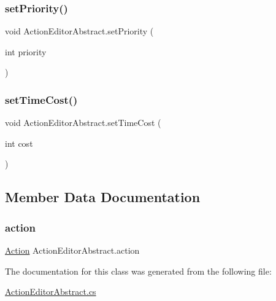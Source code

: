 \mbox{\label{class_action_editor_abstract_a2b18204979082f6227f55e357cdcc5d5}} 
\subsubsection{\texorpdfstring{set\+Priority()}{setPriority()}}
{\footnotesize\ttfamily void Action\+Editor\+Abstract.\+set\+Priority (\begin{DoxyParamCaption}\item[{int}]{priority }\end{DoxyParamCaption})}

\mbox{\label{class_action_editor_abstract_aa6da20f7ed4358957d5c4a0d3b191877}} 
\subsubsection{\texorpdfstring{set\+Time\+Cost()}{setTimeCost()}}
{\footnotesize\ttfamily void Action\+Editor\+Abstract.\+set\+Time\+Cost (\begin{DoxyParamCaption}\item[{int}]{cost }\end{DoxyParamCaption})}



\subsection{Member Data Documentation}
\mbox{\label{class_action_editor_abstract_a58e0f5d65d95e8e4b80a0b3d5e82ce7b}} 
\subsubsection{\texorpdfstring{action}{action}}
{\footnotesize\ttfamily \mbox{\hyperlink{class_action}{Action}} Action\+Editor\+Abstract.\+action}



The documentation for this class was generated from the following file\+:\begin{DoxyCompactItemize}
\item 
\mbox{\hyperlink{_action_editor_abstract_8cs}{Action\+Editor\+Abstract.\+cs}}\end{DoxyCompactItemize}
